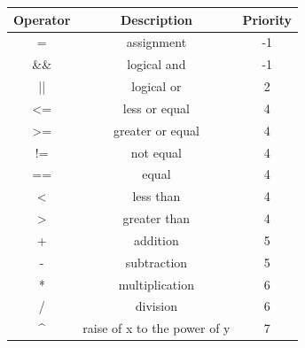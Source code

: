 \documentclass[a4paper, 11pt]{article}
\begin{document}
	\newpage	
	\begin{center}
	\begin{tabular}{| c | c | c |}
		\hline
		\textbf{Operator} & \textbf{Description} & \textbf{Priority}\\ \hline
		= & assignment & -1\\ \hline
		\&\& & logical and & -1\\ \hline
		|| & logical or & 2\\ \hline
		<= & less or equal & 4\\ \hline
		>= & greater or equal & 4\\ \hline
		!= & not equal & 4\\ \hline
		== & equal & 4\\ \hline
		< & less than & 4\\ \hline
		> & greater than & 4\\ \hline
		+ & addition & 5\\ \hline
		- & subtraction & 5\\ \hline
		* & multiplication & 6\\ \hline
		/ & division & 6\\ \hline
		\^{} & raise of x to the power of y & 7\\
		\hline
	\end{tabular}			
	\end{center}
	
	\newpage


	{}
	
\end{document}
